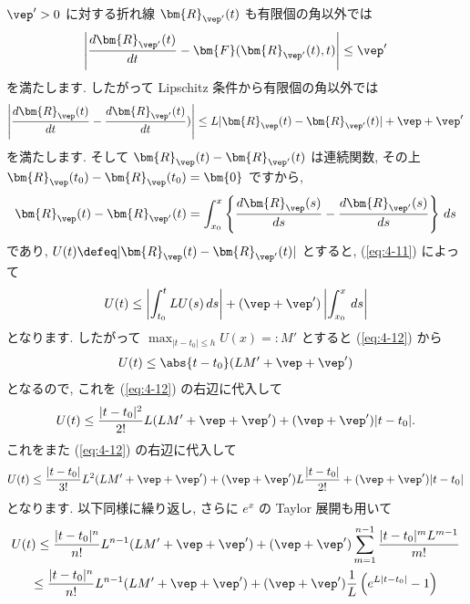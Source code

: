 \documentclass[openany, a4paper, oneside]{jsbook}
\begin{document}
$\vep ' >0$ に対する折れ線 $\bm{R}_{\vep '}(t)$ も有限個の角以外では
\begin{gather}
\left | \frac{ d \bm{R}_{\vep '} ( t ) } {dt} - \bm{F} ( \bm{R}_{\vep '} (t) , t )  \right|
\leq
\vep '
\label{eq:4-10}
\end{gather}
を満たします.
したがって Lipschitz 条件から有限個の角以外では
\begin{gather}
\left | \frac{d \bm{R}_{ \vep } (t) } {dt} - \frac{d \bm{R}_{ \vep '} (t) } {dt} ) \right|
\leq
L | \bm{R}_{\vep} (t) - \bm{R}_{\vep '} (t) | + \vep + \vep '
\label{eq:4-11}
\end{gather}
を満たします.
そして $\bm{R}_{\vep} (t) - \bm{R}_{\vep '} (t)$ は連続関数,
その上 $\bm{R}_{\vep} (t_0) - \bm{R}_{\vep} (t_0) = \bm{0}$ ですから,
\begin{gather}
\bm{R}_{\vep} (t) - \bm{R}_{\vep '} (t)
=
\int_{x_0}^x \left \{   \frac{d \bm{R}_{ \vep } (s) } {ds} - \frac{d \bm{R}_{ \vep '} (s) } {ds} \right \} \, ds
\end{gather}
であり, $U (t) \defeq | \bm{R}_{\vep} (t) - \bm{R}_{\vep '} (t) |$ とすると, (\ref{eq:4-11}) によって
\begin{gather}
 U (t)
 \leq
 \left| \int_{t_0}^t L U (s) \, ds \right|
 +( \vep + \vep ' ) \left| \int_{x_0}^x \, ds \right|
\label{eq:4-12}
\end{gather}
となります.
したがって $\max_{ | t - t_0 | \leq h } U (x) =: M'$ とすると (\ref{eq:4-12}) から
\begin{gather}
 U (t)
 \leq
 \abs{t - t_0}( LM' + \vep + \vep ' )
\end{gather}
となるので, これを (\ref{eq:4-12}) の右辺に代入して
\begin{gather}
 U (t)
 \leq
 \frac{ | t - t_0 |^2 } {2!} L ( LM' + \vep + \vep ' ) + ( \vep + \vep ' )| t - t_0 |.
\end{gather}
これをまた (\ref{eq:4-12}) の右辺に代入して
\begin{gather}
 U (t)
 \leq
 \frac{| t - t_0 |} {3!} L^2 ( LM' + \vep + \vep ' )
 +( \vep + \vep ' ) L \frac{| t - t_0 |} {2!}
 +( \vep + \vep ' ) | t - t_0 |
\end{gather}
となります.
以下同様に繰り返し, さらに $e^x$ の Taylor 展開も用いて
\begin{gather}
 U (t)
 \leq
 \frac{| t - t_0 |^n} {n!}L^{n-1} ( LM' + \vep + \vep ' )
 +( \vep + \vep ' ) \sum_{m=1}^{n-1} \frac{ | t - t_0 |^m L^{m-1} } {m!} \\
 \leq
 \frac{| t - t_0 |^n} {n!}L^{n-1} ( LM' + \vep + \vep ' )
 +( \vep + \vep ' ) \frac{1} {L} \left ( e^{ L | t - t_0 | } - 1 \right)
\end{gather}
\end{document}
